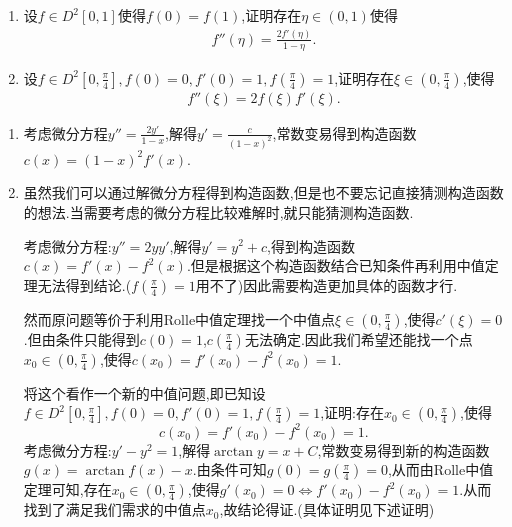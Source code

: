 \documentclass[../../main.tex]{subfiles}
\begin{document}
\begin{example}
\begin{enumerate}
\item 设\(f\in D^{2}[0,1]\)使得\(f(0)=f(1)\),证明存在\(\eta\in(0,1)\)使得
\begin{align*}
f''(\eta)=\frac{2f'(\eta)}{1 - \eta}.
\end{align*}

\item 设\(f\in D^{2}[0,\frac{\pi}{4}],f(0)=0,f'(0)=1,f(\frac{\pi}{4})=1\),证明存在\(\xi\in(0,\frac{\pi}{4})\),使得
\begin{align*}
f''(\xi)=2f(\xi)f'(\xi).
\end{align*}
\end{enumerate} 
\end{example}
\begin{remark}
\begin{enumerate}
\item 考虑微分方程\(y'' =\frac{2y'}{1-x}\),解得\(y' =\frac{c}{(1 - x)^2}\),常数变易得到构造函数\(c(x)=(1 - x)^2f'(x)\).

\item 虽然我们可以通过解微分方程得到构造函数,但是也不要忘记直接猜测构造函数的想法.当需要考虑的微分方程比较难解时,就只能猜测构造函数. 

考虑微分方程:$y''=2yy'$,解得$y'=y^2+c$,得到构造函数$c(x)=f'(x)-f^2(x)$.但是根据这个构造函数结合已知条件再利用中值定理无法得到结论.($f(\frac{\pi}{4})=1$用不了)因此需要构造更加具体的函数才行.

然而原问题等价于利用Rolle中值定理找一个中值点$\xi\in (0,\frac{\pi }{4})$,使得$c'(\xi)=0$.但由条件只能得到$c(0)=1$,$c(\frac{\pi}{4})$无法确定.因此我们希望还能找一个点$x_0\in(0,\frac{\pi }{4})$,使得$c(x_0)=f'(x_0)-f^2(x_0)=1$.

将这个看作一个新的中值问题,即已知设\(f\in D^{2}[0,\frac{\pi}{4}],f(0)=0,f'(0)=1,f(\frac{\pi}{4})=1\),证明:存在$x_0\in(0,\frac{\pi }{4})$,使得\[c(x_0)=f'(x_0)-f^2(x_0)=1.\]
考虑微分方程:$y'-y^2=1$,解得$\arctan y=x+C$,常数变易得到新的构造函数$g(x)=\arctan f(x)-x$.由条件可知$g(0)=g(\frac{\pi}{4})=0$,从而由Rolle中值定理可知,存在$x_0\in(0,\frac{\pi}{4})$,使得$g'(x_0)=0\Leftrightarrow f'(x_0)-f^2(x_0)=1$.从而找到了满足我们需求的中值点$x_0$,故结论得证.(具体证明见下述证明)
\end{enumerate}
\end{remark}
\end{document}
